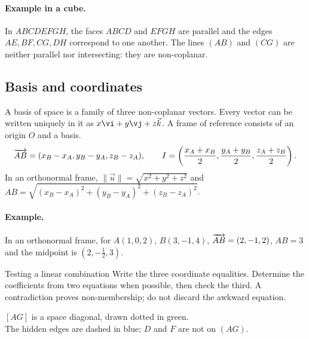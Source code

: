 \paragraph{Example in a cube.} In $ABCDEFGH$, the faces $ABCD$ and $EFGH$ are parallel and the edges $AE,BF,CG,DH$ correspond to one another. The lines $(AB)$ and $(CG)$ are neither parallel nor intersecting: they are non-coplanar.
\subsection{Basis and coordinates}
A basis of space is a family of three non-coplanar vectors. Every vector can be written uniquely in it as $x\vi +y\vj +z\vec k$. A frame of reference consists of an origin $O$ and a basis.
\[\overrightarrow{AB}=(x_B-x_A,y_B-y_A,z_B-z_A),\qquad
I=\left(\frac{x_A+x_B}2,\frac{y_A+y_B}2,\frac{z_A+z_B}2\right).\]
In an orthonormal frame, $\|\vec u\|=\sqrt{x^2+y^2+z^2}$ and $AB=\sqrt{(x_B-x_A)^2+(y_B-y_A)^2+(z_B-z_A)^2}$.
\paragraph{Example.} In an orthonormal frame, for $A(1,0,2)$, $B(3,-1,4)$, $\overrightarrow{AB}=(2,-1,2)$, $AB=3$ and the midpoint is $(2,-\frac{1}{2},3)$.
\begin{methode}{Testing a linear combination}
Write the three coordinate equalities. Determine the coefficients from two equations when possible, then check the third. A contradiction proves non-membership; do not discard the awkward equation.
\end{methode}


\begin{center}\par\small $[AG]$ is a space diagonal, drawn dotted in green.\\The hidden edges are dashed in blue; $D$ and $F$ are not on $(AG)$.\end{center}

